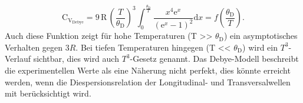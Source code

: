 \begin{equation}
  \text{C}_{\text{V}_\text{Debye}} = 9\,\text{R}\,\left(\frac{T}{\theta_\text{D}}\right)^3 \int_0^{\frac{\theta_\text{D}}{T}} \frac{x^4\text{e}^x}{\left(\text{e}^x - 1\right)^2}\text{d}x = f\left(\frac{\theta_\text{D}}{T}\right).
\end{equation}
Auch diese Funktion zeigt für hohe Temperaturen (T >> $\theta_\text{D}$) ein asymptotisches Verhalten gegen 3$R$. Bei tiefen Temperaturen hingegen (T << $\theta_\text{D}$) wird ein
$T^3$-Verlauf sichtbar, dies wird auch $T^3$-Gesetz genannt.
Das Debye-Modell beschreibt die experimentellen Werte  als eine Näherung nicht perfekt, dies könnte erreicht werden, wenn die Diespersionsrelation der Longitudinal- und Transversalwellen mit berücksichtigt wird.
